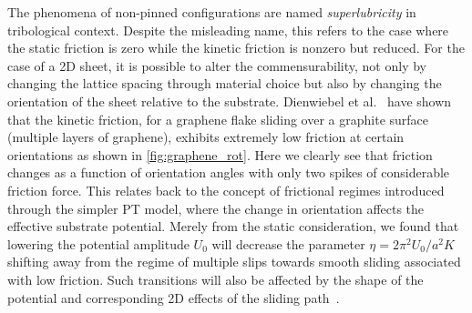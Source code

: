 

The phenomena of non-pinned configurations are named \textit{superlubricity} in
tribological context. Despite the misleading name, this refers to the case
where the static friction is zero while the kinetic friction is nonzero but
reduced. For the case of a 2D sheet, it is possible to alter the
commensurability, not only by changing the lattice spacing through material
choice but also by changing the orientation of the sheet relative to the
substrate. Dienwiebel et al.~\cite{DIENWIEBEL2005197} have shown that the
kinetic friction, for a graphene flake sliding over a graphite surface (multiple
layers of graphene), exhibits extremely low friction at certain orientations as
shown in \cref{fig:graphene_rot}. Here we clearly see that friction changes as a
function of orientation angles with only two spikes of considerable friction
force. This relates back to the concept of frictional regimes introduced through
the simpler \acrshort{PT} model, where the change in orientation affects the
effective substrate potential. Merely from the static consideration, we found that
lowering the potential amplitude $U_0$ will decrease the parameter $\eta =
2\pi^2U_0/a^2K$ shifting away from the regime of multiple slips towards smooth
sliding associated with low friction. Such transitions will also be affected by the shape of the
potential and corresponding 2D effects of the sliding path~\cite{Yalin_2011}.


